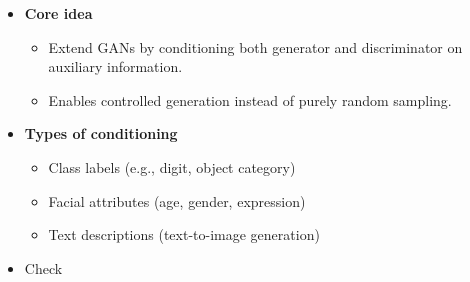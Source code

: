 \documentclass[xcolor=table]{beamer}
\begin{document}
	\begin{subsectionframe}
		\begin{itemize}
			
			\item \textbf{Core idea} 
			\begin{itemize}
				\item Extend GANs by conditioning both generator and discriminator on auxiliary information.
				\item Enables controlled generation instead of purely random sampling.
			\end{itemize}
			
			\item \textbf{Types of conditioning}
			\begin{itemize}
				\item Class labels (e.g., digit, object category)
				\item Facial attributes (age, gender, expression)
				\item Text descriptions (text-to-image generation)
			\end{itemize}
			
			\item Check \cite{mirza2014conditional}
			
		\end{itemize}
	\end{subsectionframe}
	
\end{document}
